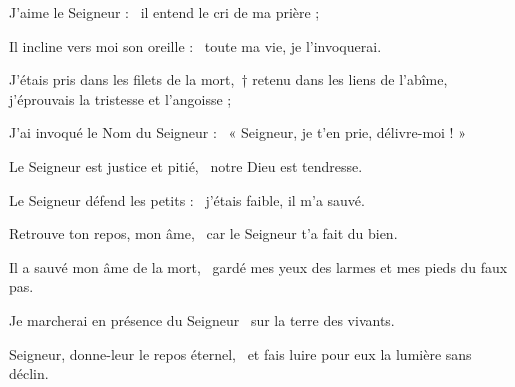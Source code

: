 \item J'aime le Seigneur :~\psstar{} il entend le cri de ma prière ;

\item Il incline vers moi son oreille :~\psstar{} toute ma vie, je l'invoquerai.

\item J'étais pris dans les filets de la mort,~† retenu dans les liens de l'abîme,~\psstar{} j'éprouvais la tristesse et l'angoisse ;

\item J'ai invoqué le Nom du Seigneur :~\psstar{} « Seigneur, je t'en prie, délivre-moi ! »

\item Le Seigneur est justice et pitié,~\psstar{} notre Dieu est tendresse.

\item Le Seigneur défend les petits :~\psstar{} j'étais faible, il m'a sauvé.

\item Retrouve ton repos, mon âme,~\psstar{} car le Seigneur t'a fait du bien.

\item Il a sauvé mon âme de la mort,~\psstar{} gardé mes yeux des larmes et mes pieds du faux pas.

\item Je marcherai en présence du Seigneur~\psstar{} sur la terre des vivants.

\item Seigneur, donne-leur le repos éternel,~\psstar{} et fais luire pour eux la lumière sans déclin.